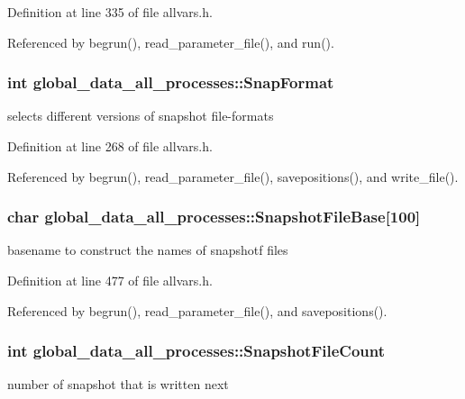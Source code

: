 Definition at line 335 of file allvars.h.



Referenced by begrun(), read\_\-parameter\_\-file(), and run().

\hypertarget{structglobal__data__all__processes_a6e7d07e68bd6242059d1adac6dabf0d1}{
\subsubsection[{SnapFormat}]{\setlength{\rightskip}{0pt plus 5cm}int {\bf global\_\-data\_\-all\_\-processes::SnapFormat}}}
\label{structglobal__data__all__processes_a6e7d07e68bd6242059d1adac6dabf0d1}
selects different versions of snapshot file-\/formats 

Definition at line 268 of file allvars.h.



Referenced by begrun(), read\_\-parameter\_\-file(), savepositions(), and write\_\-file().

\hypertarget{structglobal__data__all__processes_a4bcf5b5c31545691038015af9ae9acb3}{
\subsubsection[{SnapshotFileBase}]{\setlength{\rightskip}{0pt plus 5cm}char {\bf global\_\-data\_\-all\_\-processes::SnapshotFileBase}\mbox{[}100\mbox{]}}}
\label{structglobal__data__all__processes_a4bcf5b5c31545691038015af9ae9acb3}
basename to construct the names of snapshotf files 

Definition at line 477 of file allvars.h.



Referenced by begrun(), read\_\-parameter\_\-file(), and savepositions().

\hypertarget{structglobal__data__all__processes_aac0d3fcbac688a31e6bda55ef819c44b}{
\subsubsection[{SnapshotFileCount}]{\setlength{\rightskip}{0pt plus 5cm}int {\bf global\_\-data\_\-all\_\-processes::SnapshotFileCount}}}
\label{structglobal__data__all__processes_aac0d3fcbac688a31e6bda55ef819c44b}
number of snapshot that is written next 


